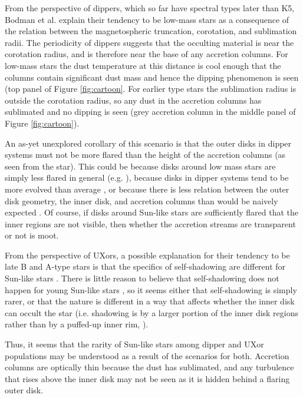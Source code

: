 \documentclass[]{rsos}
\begin{document}
From the perspective of dippers, which so far have spectral types later than K5, Bodman
et al.  \cite{2016arXiv160503985B} explain their tendency to be low-mass stars as a
consequence of the relation between the magnetospheric truncation, corotation, and
sublimation radii. The periodicity of dippers suggests that the occulting material is
near the corotation radius, and is therefore near the base of any accretion columns. For
low-mass stars the dust temperature at this distance is cool enough that the columns
contain significant dust mass and hence the dipping phenomenon is seen (top panel of
Figure \ref{fig:cartoon}. For earlier type stars the sublimation radius is outside the
corotation radius, so any dust in the accretion columns has sublimated and no dipping is
seen (grey accretion column in the middle panel of Figure \ref{fig:cartoon}).

An as-yet unexplored corollary of this scenario is that the outer disks in dipper systems
must not be more flared than the height of the accretion columns (as seen from the
star). This could be because disks around low mass stars are simply less flared in
general (e.g. \cite{2010ApJ...720.1668S}), because disks in dipper systems tend to be
more evolved than average \cite{2016ApJ...816...69A}, or because there is less relation
between the outer disk geometry, the inner disk, and accretion columns than would be
naively expected \cite{2016MNRAS.462L.101A}. Of course, if disks around Sun-like stars
are sufficiently flared that the inner regions are not visible, then whether the
accretion streams are transparent or not is moot.

From the perspective of UXors, a possible explanation for their tendency to be late B and
A-type stars is that the specifics of self-shadowing are different for Sun-like stars
\cite{2003ApJ...594L..47D}. There is little reason to believe that self-shadowing does
not happen for young Sun-like stars \cite{1987ApJ...323..714K,2004A&A...421.1075D}, so it
seems either that self-shadowing is simply rarer, or that the nature is different in a
way that affects whether the inner disk can occult the star (i.e. shadowing is by a
larger portion of the inner disk regions rather than by a puffed-up inner rim,
\cite{2004A&A...421.1075D,2007prpl.conf..555D}).

Thus, it seems that the rarity of Sun-like stars among dipper and UXor populations may be
understood as a result of the scenarios for both. Accretion columns are optically thin
because the dust has sublimated, and any turbulence that rises above the inner disk may
not be seen as it is hidden behind a flaring outer disk.
\end{document}
